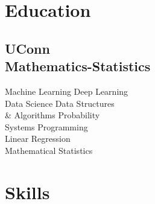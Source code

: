 \documentclass[]{resume-template}
\begin{document}
%
%
\lastupdated{}

%
%

%
%

\begin{minipage}[t]{0.33\textwidth}


  \section{Education}\label{sec:education}

  \subsection{UConn\\
  Mathematics-Statistics}\label{subsec:uconn}
  \vspace{\topsep}

  \label{subsec:coursework}
  Machine Learning \textbullet{}Deep Learning\\
  Data Science \textbullet{} Data Structures \\\& Algorithms\textbullet{} Probability\\ Systems Programming\textbullet{} \\Linear Regression\textbullet{}\\Mathematical Statistics
  \sectionsep{}


  \section{Skills}\label{sec:skills}

\end{minipage}
\end{document}
